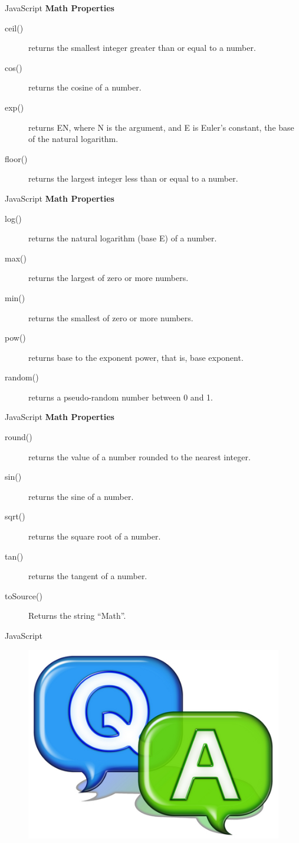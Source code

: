 \documentclass[14pt]{beamer}
\begin{document}
\begin{frame}{JavaScript}
\textbf{Math Properties}
\begin{description}
  \item [ceil()] returns the smallest integer greater than or equal to a number.
  \item [cos()] returns the cosine of a number.
 \item [exp()] returns EN, where N is the argument, and E is Euler's constant, the base of the natural logarithm.
 \item [floor()] returns the largest integer less than or equal to a number.
\end{description}
\end{frame}

\begin{frame}{JavaScript}
\textbf{Math Properties}
\begin{description}
 \item [log()] returns the natural logarithm (base E) of a number.
 \item [max()] returns the largest of zero or more numbers.
 \item [min()] returns the smallest of zero or more numbers.
 \item [pow()] returns base to the exponent power, that is, base exponent.
 \item [random()] returns a pseudo-random number between 0 and 1.
\end{description}
\end{frame}

\begin{frame}{JavaScript}
\textbf{Math Properties}
\begin{description}
 \item [round()] returns the value of a number rounded to the nearest integer.
 \item [sin()] returns the sine of a number.
 \item [sqrt()] returns the square root of a number.
 \item [tan()] returns the tangent of a number.
 \item [toSource()] Returns the string ``Math''.
\end{description}
\end{frame}




\begin{frame}{JavaScript}
 \begin{figure}[H]
    \includegraphics[scale=.3]{qa.png}   
   \end{figure}
\end{frame}
\end{document}

